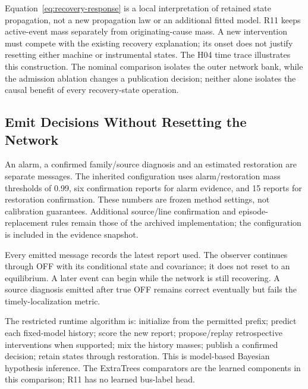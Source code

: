 Equation~\eqref{eq:recovery-response} is a local interpretation of retained
state propagation, not a new propagation law or an additional fitted model.
R11 keeps active-event mass separately from originating-cause mass. A new
intervention must compete with the existing recovery explanation; its
onset does not justify resetting either machine or instrumental states.
The H04 time trace illustrates this construction. The nominal comparison
isolates the outer network bank, while the admission ablation changes a
publication decision; neither alone isolates the causal benefit of every
recovery-state operation.

\subsection{Emit Decisions Without Resetting the Network}

An alarm, a confirmed family/source diagnosis and an estimated restoration are separate messages. The inherited configuration uses alarm/restoration mass thresholds of 0.99, six confirmation reports for alarm evidence, and 15 reports for restoration confirmation. These numbers are frozen method settings, not calibration guarantees. Additional source/line confirmation and episode-replacement rules remain those of the archived implementation; the configuration is included in the evidence snapshot.

Every emitted message records the latest report used. The observer continues through OFF with its conditional state and covariance; it does not reset to an equilibrium. A later event can begin while the network is still recovering. A source diagnosis emitted after true OFF remains correct eventually but fails the timely-localization metric.

The restricted runtime algorithm is: initialize from the permitted prefix; predict each fixed-model history; score the new report; propose/replay retrospective interventions when supported; mix the history masses; publish a confirmed decision; retain states through restoration. This is model-based Bayesian hypothesis inference. The ExtraTrees comparators are the learned components in this comparison; R11 has no learned bus-label head.
